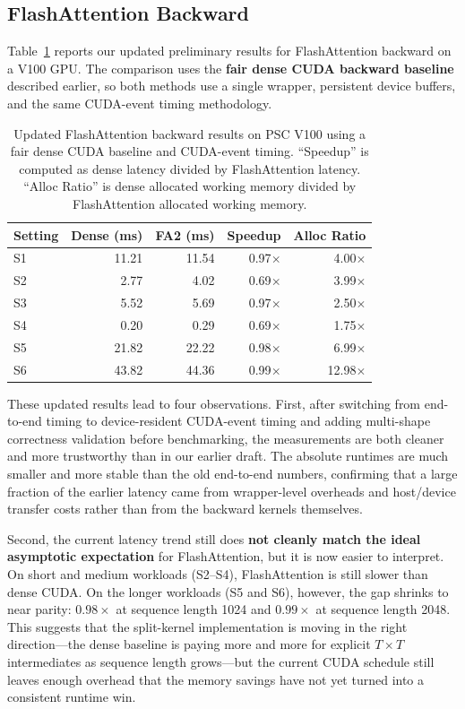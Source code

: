 \documentclass{article}
\begin{document}
\subsection{FlashAttention Backward}

Table~\ref{tab:fa2-backward-prelim} reports our updated preliminary results for FlashAttention backward on a V100 GPU. The comparison uses the \textbf{fair dense CUDA backward baseline} described earlier, so both methods use a single wrapper, persistent device buffers, and the same CUDA-event timing methodology.

\begin{table}[t]
\centering
\small
\begin{tabular}{lrrrr}
\toprule
Setting & Dense (ms) & FA2 (ms) & Speedup & Alloc Ratio \\
\midrule
S1 & 11.21 & 11.54 & 0.97$\times$ & 4.00$\times$ \\
S2 & 2.77 & 4.02 & 0.69$\times$ & 3.99$\times$ \\
S3 & 5.52 & 5.69 & 0.97$\times$ & 2.50$\times$ \\
S4 & 0.20 & 0.29 & 0.69$\times$ & 1.75$\times$ \\
S5 & 21.82 & 22.22 & 0.98$\times$ & 6.99$\times$ \\
S6 & 43.82 & 44.36 & 0.99$\times$ & 12.98$\times$ \\
\bottomrule
\end{tabular}
\caption{Updated FlashAttention backward results on PSC V100 using a fair dense CUDA baseline and CUDA-event timing. ``Speedup'' is computed as dense latency divided by FlashAttention latency. ``Alloc Ratio'' is dense allocated working memory divided by FlashAttention allocated working memory.}
\label{tab:fa2-backward-prelim}
\end{table}

These updated results lead to four observations. First, after switching from end-to-end timing to device-resident CUDA-event timing and adding multi-shape correctness validation before benchmarking, the measurements are both cleaner and more trustworthy than in our earlier draft. The absolute runtimes are much smaller and more stable than the old end-to-end numbers, confirming that a large fraction of the earlier latency came from wrapper-level overheads and host/device transfer costs rather than from the backward kernels themselves.

Second, the current latency trend still does \textbf{not cleanly match the ideal asymptotic expectation} for FlashAttention, but it is now easier to interpret. On short and medium workloads (S2--S4), FlashAttention is still slower than dense CUDA. On the longer workloads (S5 and S6), however, the gap shrinks to near parity: $0.98\times$ at sequence length 1024 and $0.99\times$ at sequence length 2048. This suggests that the split-kernel implementation is moving in the right direction---the dense baseline is paying more and more for explicit $T \times T$ intermediates as sequence length grows---but the current CUDA schedule still leaves enough overhead that the memory savings have not yet turned into a consistent runtime win.
\end{document}
